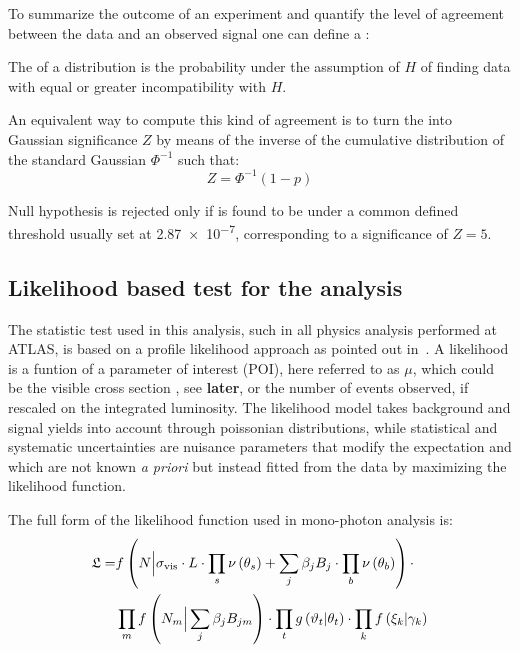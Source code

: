 To summarize the outcome of an experiment and quantify the level of agreement between the data and an observed signal one can define a \p:
\begin{definizione}
  The \p of a distribution is the probability under the assumption of $H$ of finding data with equal or greater incompatibility with $H$.
\end{definizione}

An equivalent way to compute this kind of agreement is to turn the \p into Gaussian significance $Z$ by means of the inverse of the cumulative distribution of the standard Gaussian $\Phi^{-1}$ such that:
\begin{equation}
  Z = \Phi^{-1}(1-p)
\end{equation}

Null hypothesis is rejected only if \p is found to be under a common defined threshold usually set at \num{2.87e-7}, corresponding to a significance of $Z=5$.

\subsection{Likelihood based test for the \mph analysis}
\label{sec:likelihood}
The statistic test used in this analysis, such in all physics analysis performed at ATLAS, is based on a profile likelihood approach as pointed out in~\cite{mgiulia}. A likelihood is a funtion of a parameter of interest (POI), here referred to as $\mu$, which could be the visible cross section \sv, see \textbf{later}, or the number of events observed, if rescaled on the integrated luminosity.
The likelihood model takes background and signal yields into account through poissonian distributions, while statistical and systematic uncertainties are nuisance parameters that modify the expectation and which are not known {\itshape a priori} but instead fitted from the data by maximizing the likelihood function.

The full form of the likelihood function used in mono-photon analysis is: 
\begin{equation}
  \label{eqn:likelihood}
  \begin{split}
    \mathfrak{L} = &  f\left( N \Big\vert \sigma_{\textup{vis}} \cdot L \cdot \prod_s \nu\left(\theta_{s}\right) +\sum _j \beta_{j} B_{j}\cdot \prod_b \nu\left(\theta_{b}\right)\right) \cdot \\
    & \prod_m f\left(N_{m} \Big\vert \sum _j \beta_{j} B_{jm}\right) \cdot \prod _t g\left(\vartheta_{t} \vert \theta_{t}\right) \cdot \prod _k f\left(\xi_{k} \vert \gamma_{k}\right)
  \end{split}
\end{equation}

